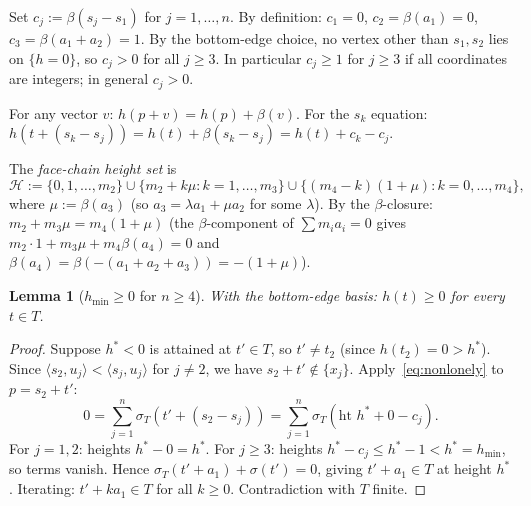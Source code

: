 \documentclass{article}
\newtheorem{lemma}{Lemma}
\begin{document}
Set $c_j:=\beta(s_j-s_1)$ for $j=1,\dots,n$.  By definition: $c_1=0$, $c_2=\beta(a_1)=0$,
$c_3=\beta(a_1+a_2)=1$.
By the bottom-edge choice, no vertex other than $s_1,s_2$ lies on $\{h=0\}$,
so $c_j>0$ for all $j\ge 3$.  In particular $c_j\ge 1$ for $j\ge 3$ if all
coordinates are integers; in general $c_j>0$.

For any vector $v$: $h(p+v)=h(p)+\beta(v)$.
For the $s_k$ equation: $h(t+(s_k-s_j))=h(t)+\beta(s_k-s_j)=h(t)+c_k-c_j$.

The \emph{face-chain height set} is
\[
  \mathcal{H}:=\{0,1,\dots,m_2\}\cup\{m_2+k\mu: k=1,\dots,m_3\}
  \cup\{(m_4-k)(1+\mu): k=0,\dots,m_4\},
\]
where $\mu:=\beta(a_3)$ (so $a_3=\lambda a_1+\mu a_2$ for some $\lambda$).
By the $\beta$-closure: $m_2+m_3\mu=m_4(1+\mu)$ (the $\beta$-component of
$\sum m_i a_i=0$ gives $m_2\cdot 1+m_3\mu+m_4\beta(a_4)=0$ and
$\beta(a_4)=\beta(-(a_1+a_2+a_3))=-(1+\mu)$).

\begin{lemma}[$h_{\min}\ge 0$ for $n\ge 4$]\label{lem:betamin4}
With the bottom-edge basis: $h(t)\ge 0$ for every $t\in T$.
\end{lemma}
\begin{proof}
Suppose $h^*<0$ is attained at $t'\in T$, so $t'\ne t_2$ (since $h(t_2)=0>h^*$).
Since $\langle s_2,u_j\rangle<\langle s_j,u_j\rangle$ for $j\ne 2$, we have
$s_2+t'\notin\{x_j\}$.  Apply~\eqref{eq:nonlonely} to $p=s_2+t'$:
\[
  0=\sum_{j=1}^n\sigma_T(t'+(s_2-s_j))=\sum_{j=1}^n\sigma_T(\text{ht }h^*+0-c_j).
\]
For $j=1,2$: heights $h^*-0=h^*$.  For $j\ge 3$: heights $h^*-c_j\le h^*-1<h^*=h_{\min}$,
so terms vanish.  Hence $\sigma_T(t'+a_1)+\sigma(t')=0$, giving $t'+a_1\in T$ at
height $h^*$.  Iterating: $t'+ka_1\in T$ for all $k\ge 0$.  Contradiction with $T$ finite.
\end{proof}
\end{document}
